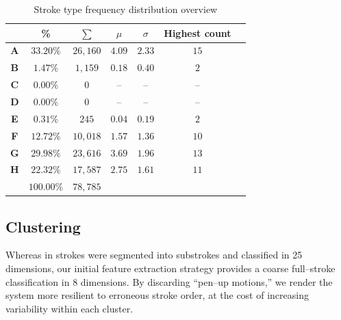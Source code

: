 \documentclass[10pt,conference,a4paper]{IEEEtran}
\begin{document}
	\begin{table}
		\renewcommand{\arraystretch}{1.3}
		\caption{Stroke type frequency distribution overview }
		\label{tbl_stroke_analysis}
		\centering
		\begin{tabular}{ c | c c c c c l }
			\hline
			  & \bfseries \% & \small $\sum$ & $\mu$ & $\sigma$ & Highest count \\ 
			\hline
			\hline
			\bfseries A & $33.20\%$ & $26,160$ & $4.09$ & $2.33$ & $15$ & \\%
			\bfseries B & $1.47\%$  & $1,159$  & $0.18$ & $0.40$ & $2$  & \\%
			\bfseries C & $0.00\%$  & $0$      & --     & --     & --   & \\%
			\bfseries D & $0.00\%$  & $0$      & --     & --     & --   & \\%
			\bfseries E & $0.31\%$  & $245$    & $0.04$ & $0.19$ & $2$  & \\%
			\bfseries F & $12.72\%$ & $10,018$ & $1.57$ & $1.36$ & $10$ & \\%
			\bfseries G & $29.98\%$ & $23,616$ & $3.69$ & $1.96$ & $13$ & \\%
			\bfseries H & $22.32\%$ & $17,587$ & $2.75$ & $1.61$ & $11$ & \\%
			\hline
			            & $100.00\%$   & $78,785$ &        &        &      & \\
			\hline
		\end{tabular}
	\end{table}



	\subsection{Clustering}

	Whereas in \cite{nakai2001substroke} strokes were segmented into substrokes and classified in
	25 dimensions, our initial feature extraction strategy provides a coarse full--stroke classification
	in 8 dimensions. By discarding ``pen--up motions,'' we render the system more resilient to erroneous
	stroke order, at the cost of increasing variability within each cluster.
\end{document}
